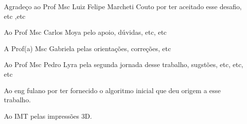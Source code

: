 \begin{agradecimentos}

Agradeço ao Prof Msc Luiz Felipe Marcheti Couto por ter aceitado esse desafio, etc ,etc

Ao Prof Msc Carlos Moya pelo apoio, dúvidas, etc, etc

A Prof(a) Msc Gabriela pelas orientações, correções, etc 

Ao Prof Msc Pedro Lyra pela segunda jornada desse trabalho, sugstões, etc, etc, etc

Ao eng fulano por ter fornecido o algoritmo inicial que deu origem a esse trabalho.

Ao IMT pelas impressões 3D.


\end{agradecimentos}